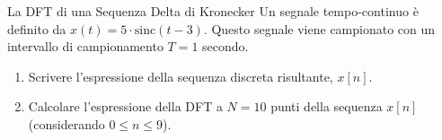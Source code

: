
\begin{esercizio}{La DFT di una Sequenza Delta di Kronecker}
    Un segnale tempo-continuo è definito da $x(t) = 5 \cdot \text{sinc}(t - 3)$. Questo segnale viene campionato con un intervallo di campionamento $T=1$ secondo.
    
    \begin{enumerate}
        \item Scrivere l'espressione della sequenza discreta risultante, $x[n]$.
        \item Calcolare l'espressione della DFT a $N=10$ punti della sequenza $x[n]$ (considerando $0 \leq n \leq 9$).
    \end{enumerate}
\end{esercizio}